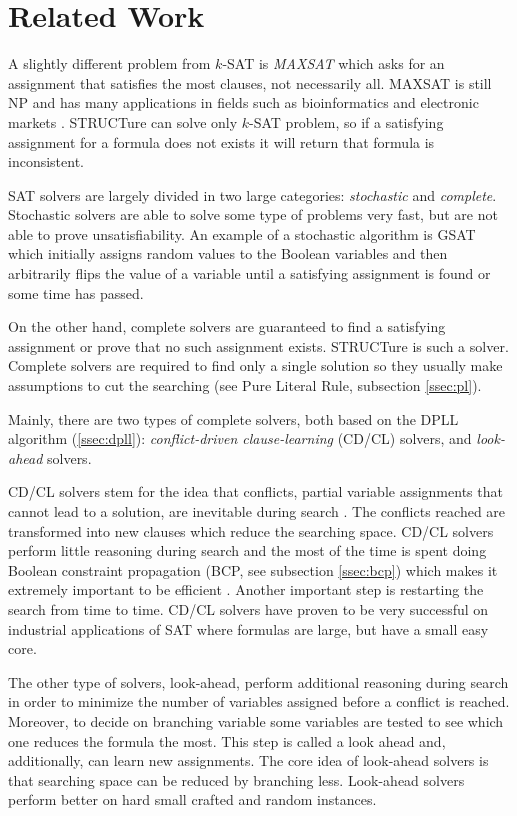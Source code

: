 \chapter{Related Work}
\label{chap:related}

A slightly different problem from $k$-SAT is \emph{MAXSAT}
which asks for an assignment that satisfies the most
clauses, not necessarily all. MAXSAT is still NP and has
many applications in fields such as bioinformatics and
electronic markets \cite{Strickland:2005:OPS:1075300.1075321,
Sandholm:2002:AOW:506694.506695}. STRUCTure can solve only $k$-SAT
problem, so if a satisfying assignment for a formula does not exists
it will return that formula is inconsistent.

SAT solvers are largely divided in two large categories:
\emph{stochastic} and \emph{complete}.  Stochastic solvers are
able to solve some type of problems very fast, but are not able
to prove unsatisfiability. An example of a stochastic algorithm
is GSAT \cite{Selman95localsearch} which initially assigns random
values to the Boolean variables and then arbitrarily flips the value
of a variable until a satisfying assignment is found or some time
has passed.

On the other hand, complete solvers are guaranteed to find a
satisfying assignment or prove that no such assignment exists.
STRUCTure is such a solver. Complete solvers are required to find
only a single solution so they usually make assumptions to cut the
searching (see Pure Literal Rule, subsection \ref{ssec:pl}).

Mainly, there are two types of complete solvers, both based
on the DPLL algorithm (\ref{ssec:dpll}): \emph{conflict-driven
clause-learning} (CD/CL) solvers, and \emph{look-ahead} solvers.

CD/CL solvers stem for the idea that conflicts, partial variable
assignments that cannot lead to a solution, are inevitable during
search \cite{Marques-silva99grasp:a}. The conflicts reached are
transformed into new clauses which reduce the searching space.
CD/CL solvers perform little reasoning during search and the most
of the time is spent doing Boolean constraint propagation (BCP,
see subsection \ref{ssec:bcp}) which makes it extremely important
to be efficient \cite{Moskewicz:2001:CEE:378239.379017}. Another
important step is restarting the search from time to time. CD/CL
solvers have proven to be very successful on industrial applications
of SAT where formulas are large, but have a small easy core.

The other type of solvers, look-ahead, perform additional reasoning
during search in order to minimize the number of variables
assigned before a conflict is reached. Moreover, to decide on
branching variable some variables are tested to see which one
reduces the formula the most. This step is called a look ahead and,
additionally, can learn new assignments. The core idea
of look-ahead solvers is that searching space can be reduced by
branching less. Look-ahead solvers perform better on hard small
crafted and random instances.

